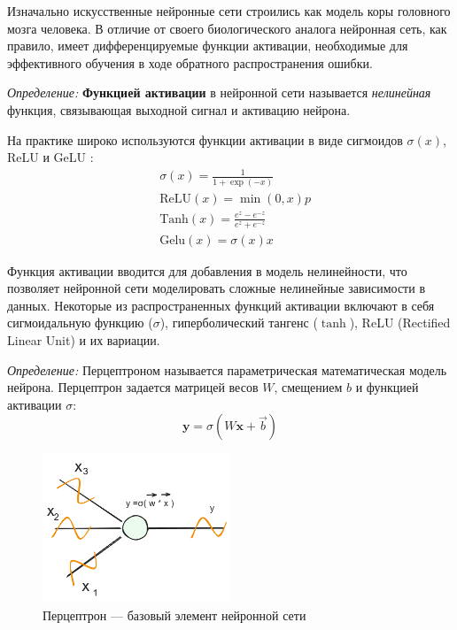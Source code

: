 Изначально искусственные нейронные сети строились как модель коры головного мозга человека. 
В отличие от своего биологического аналога нейронная сеть, как правило, имеет дифференцируемые функции 
активации, необходимые для эффективного обучения в ходе обратного распространения ошибки.

\textit{Определение:} \textbf{Функцией активации} в нейронной сети называется \textit{нелинейная} функция,
связывающая выходной сигнал и активацию нейрона. 

На практике широко используются функции активации в виде сигмоидов $\sigma(x)$, ReLU \cite{agarap2018deep} и 
GeLU \cite{hendrycks2016gaussian}:
\begin{equation}
  \begin{aligned}
    & \sigma(x) = \frac{1}{1+\exp(-x)} \\
    &\text{ReLU}(x) = \min(0,x)p \\
    &\text{Tanh}(x) = \frac{e^{z}-e^{-z}}{e^{z}+e^{-z}} \\
    &\text{Gelu}(x) = \sigma(x) x 
  \end{aligned}
\end{equation}

Функция активации вводится для добавления в модель нелинейности, что позволяет нейронной сети моделировать сложные 
нелинейные зависимости в данных. Некоторые из распространенных функций активации включают в себя сигмоидальную 
функцию (\( \sigma \)), гиперболический тангенс (\( \tanh \)), ReLU (Rectified Linear Unit) и их вариации.

\textit{Определение:} Перцептроном называется параметрическая математическая модель нейрона. Перцептрон
задается матрицей весов $W$, смещением $b$ и функцией активации $\sigma$:
\begin{equation}
  \mathbf{y} = \sigma(W \mathbf{x} + \vec{b})
\end{equation}

\begin{figure}[h]
  \centering
  \includegraphics[width=0.5\textwidth]{assets/ml/nn/perceptron.excalidraw.png}
  \caption{Перцептрон --- базовый элемент нейронной сети}
  \label{perceptron}
\end{figure}

